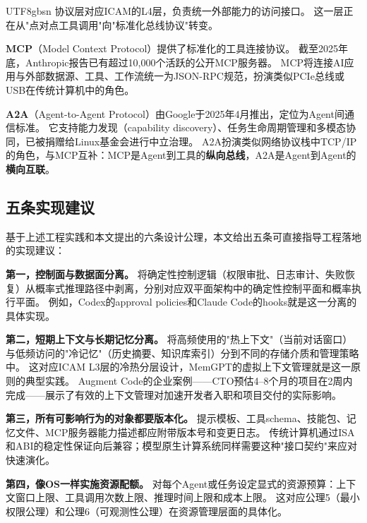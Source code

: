 \documentclass[11pt,a4paper]{article}
\begin{document}
\begin{CJK*}{UTF8}{gbsn}
协议层对应ICAM的L4层，负责统一外部能力的访问接口。
这一层正在从"点对点工具调用"向"标准化总线协议"转变。

\textbf{MCP}（Model Context Protocol）提供了标准化的工具连接协议\cite{mcp_intro_2026}。
截至2025年底，Anthropic报告已有超过10{,}000个活跃的公开MCP服务器\cite{mcpadoption2026}。
MCP将连接AI应用与外部数据源、工具、工作流统一为JSON-RPC规范，扮演类似PCIe总线或USB在传统计算机中的角色。

\textbf{A2A}（Agent-to-Agent Protocol）由Google于2025年4月推出，定位为Agent间通信标准\cite{google_a2a_2025,agentprotocols2025}。
它支持能力发现（capability discovery）、任务生命周期管理和多模态协同，已被捐赠给Linux基金会进行中立治理\cite{a2alinux2025}。
A2A扮演类似网络协议栈中TCP/IP的角色，与MCP互补：MCP是Agent到工具的\textbf{纵向总线}，A2A是Agent到Agent的\textbf{横向互联}。

\subsection{五条实现建议}

基于上述工程实践和本文提出的六条设计公理，本文给出五条可直接指导工程落地的实现建议：

\textbf{第一，控制面与数据面分离。}
将确定性控制逻辑（权限审批、日志审计、失败恢复）从概率式推理路径中剥离，分别对应双平面架构中的确定性控制平面和概率执行平面。
例如，Codex的approval policies和Claude Code的hooks就是这一分离的具体实现\cite{openai_codex_approvals_2026,anthropic_claudecode_security_2026}。

\textbf{第二，短期上下文与长期记忆分离。}
将高频使用的"热上下文"（当前对话窗口）与低频访问的"冷记忆"（历史摘要、知识库索引）分到不同的存储介质和管理策略中。
这对应ICAM L3层的冷热分层设计，MemGPT的虚拟上下文管理就是这一原则的典型实践\cite{memgpt2023}。
Augment Code的企业案例——CTO预估4--8个月的项目在2周内完成\cite{anthropic2026agenticreport}——展示了有效的上下文管理对加速开发者入职和项目交付的实际影响。

\textbf{第三，所有可影响行为的对象都要版本化。}
提示模板、工具schema、技能包、记忆文件、MCP服务器能力描述都应附带版本号和变更日志\cite{mcp_intro_2026,agentprotocols2025}。
传统计算机通过ISA和ABI的稳定性保证向后兼容；模型原生计算系统同样需要这种"接口契约"来应对快速演化。

\textbf{第四，像OS一样实施资源配额。}
对每个Agent或任务设定显式的资源预算：上下文窗口上限、工具调用次数上限、推理时间上限和成本上限\cite{linux_cgroup_2026}。
这对应公理5（最小权限公理）和公理6（可观测性公理）在资源管理层面的具体化。


\end{CJK*}
\end{document}
